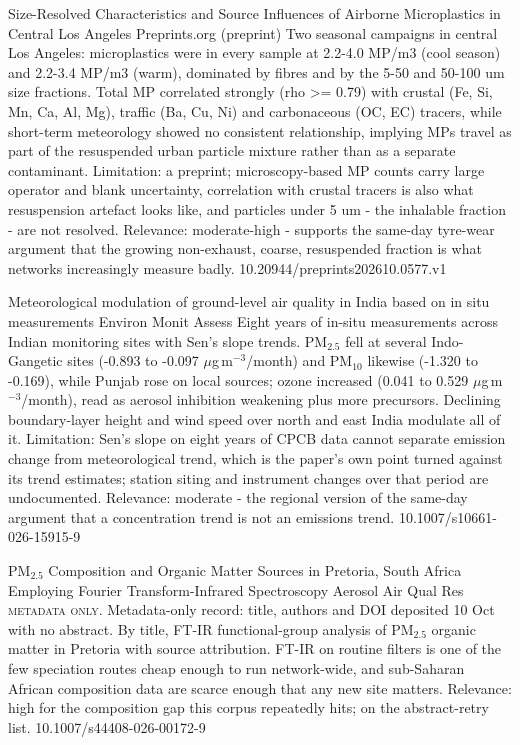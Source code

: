 \documentclass[10pt]{article}
\begin{document}
\par{}\baselineskip{}\baselineskip
{}

{Size-Resolved Characteristics and Source Influences of Airborne Microplastics in Central Los Angeles}
{Preprints.org (preprint)}
{Two seasonal campaigns in central Los Angeles: microplastics were in every sample at 2.2-4.0 MP/m3 (cool season) and 2.2-3.4 MP/m3 (warm), dominated by fibres and by the 5-50 and 50-100 um size fractions. Total MP correlated strongly (rho >= 0.79) with crustal (Fe, Si, Mn, Ca, Al, Mg), traffic (Ba, Cu, Ni) and carbonaceous (OC, EC) tracers, while short-term meteorology showed no consistent relationship, implying MPs travel as part of the resuspended urban particle mixture rather than as a separate contaminant. Limitation: a preprint; microscopy-based MP counts carry large operator and blank uncertainty, correlation with crustal tracers is also what resuspension artefact looks like, and particles under 5 um - the inhalable fraction - are not resolved. Relevance: moderate-high - supports the same-day tyre-wear argument that the growing non-exhaust, coarse, resuspended fraction is what networks increasingly measure badly.}
{10.20944/preprints202610.0577.v1}

{Meteorological modulation of ground-level air quality in India based on in situ measurements}
{Environ Monit Assess}
{Eight years of in-situ measurements across Indian monitoring sites with Sen's slope trends. PM$_{2.5}$ fell at several Indo-Gangetic sites (-0.893 to -0.097 $\mu$g\,m$^{-3}$/month) and PM$_{10}$ likewise (-1.320 to -0.169), while Punjab rose on local sources; ozone increased (0.041 to 0.529 $\mu$g\,m$^{-3}$/month), read as aerosol inhibition weakening plus more precursors. Declining boundary-layer height and wind speed over north and east India modulate all of it. Limitation: Sen's slope on eight years of CPCB data cannot separate emission change from meteorological trend, which is the paper's own point turned against its trend estimates; station siting and instrument changes over that period are undocumented. Relevance: moderate - the regional version of the same-day argument that a concentration trend is not an emissions trend.}
{10.1007/s10661-026-15915-9}

{PM$_{2.5}$ Composition and Organic Matter Sources in Pretoria, South Africa Employing Fourier Transform-Infrared Spectroscopy}
{Aerosol Air Qual Res}
{\textsc{metadata only.} Metadata-only record: title, authors and DOI deposited 10 Oct with no abstract. By title, FT-IR functional-group analysis of PM$_{2.5}$ organic matter in Pretoria with source attribution. FT-IR on routine filters is one of the few speciation routes cheap enough to run network-wide, and sub-Saharan African composition data are scarce enough that any new site matters. Relevance: high for the composition gap this corpus repeatedly hits; on the abstract-retry list.}
{10.1007/s44408-026-00172-9}
\end{document}

